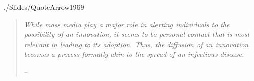 {    \begin{authorsinfo}
    \end{authorsinfo}
    
    \begin{center}
      \begin{minipage}{0.9\textwidth}
        {\footnotesize \thankstext \normalsize}
      \end{minipage}
    \end{center}
    \titlepagefinish
    \small
    \pagebreak
    \renewcommand{\listtablename}{\normalsize Tables}
    \renewcommand{\listfigurename}{\normalsize Figures}
    \listoffigures 

    \medskip\medskip
    \listoftables
    \normalsize
  }

  \setcounter{page}{0}

  \begin{verbatimwrite}{./Slides/QuoteArrow1969}%
    \begin{quote}
      \textit{While mass media play a major role in alerting individuals to the possibility of an innovation, it seems to be personal contact that is most relevant in leading to its adoption. Thus, the diffusion of an innovation becomes a process formally akin to the spread of an infectious disease.}

      \medskip
      \indent -- \href{https://github.com/iworld1991/EpiExp/blob/master/Literature/arrow_classificatory_1969.pdf}{\cite{arrow_classificatory_1969}}
    \end{quote}
  \end{verbatimwrite} %

